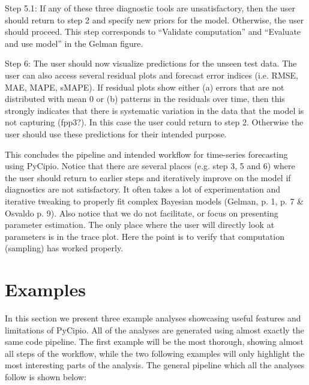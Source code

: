 \documentclass{article}
\begin{document}
Step 5.1: If any of these three diagnostic tools are unsatisfactory, then the user should return to step 2 and specify new priors for the model. Otherwise, the user should proceed. This step corresponds to “Validate computation” and “Evaluate and use model” in the Gelman figure.

Step 6: The user should now visualize predictions for the unseen test data. The user can also access several residual plots and forecast error indices (i.e. RMSE, MAE, MAPE, sMAPE). If residual plots show either (a) errors that are not distributed with mean 0 or (b) patterns in the residuals over time, then this strongly indicates that there is systematic variation in the data that the model is not capturing (fpp3?). In this case the user could return to step 2. Otherwise the user should use these predictions for their intended purpose. 

This concludes the pipeline and intended workflow for time-series forecasting using PyCipio. Notice that there are several places (e.g. step 3, 5 and 6) where the user should return to earlier steps and iteratively improve on the model if diagnostics are not satisfactory. It often takes a lot of experimentation and iterative tweaking to properly fit complex Bayesian models (Gelman, p. 1, p. 7 \& Osvaldo p. 9). Also notice that we do not facilitate, or focus on presenting parameter estimation. The only place where the user will directly look at parameters is in the trace plot. Here the point is to verify that computation (sampling) has worked properly. 

\section{Examples}

In this section we present three example analyses showcasing useful features and limitations of PyCipio. All of the analyses are generated using almost exactly the same code pipeline. The first example will be the most thorough, showing almost all steps of the workflow, while the two following examples will only highlight the most interesting parts of the analysis. The general pipeline which all the analyses follow is shown below: 

\lstset{frame=lines}
\end{document}
